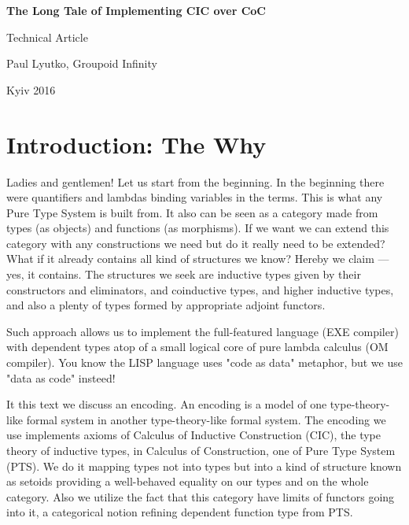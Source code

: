 \documentclass[11pt,oneside]{article}
\begin{document}
\thispagestyle{empty}
\begin{center}
\vspace{3cm}
    \vspace{3cm}   {\Large \bf The Long Tale of Implementing CIC over CoC\\}\par
    \vspace{0.3cm} {\Large Technical Article\par}
    \vspace{0.3cm} {\Large Paul Lyutko, Groupoid Infinity\par}
    \vspace{4cm}   {\Large Kyiv 2016}
\end{center}

\newpage
\vspace{2cm}
\tableofcontents

\newpage
\section{Introduction: The Why}

Ladies and gentlemen! Let us start from the beginning.
In the beginning there were quantifiers and lambdas binding variables in the terms.
This is what any Pure Type System is built from.
It also can be seen as a category made from types (as objects) and functions (as morphisms).
If we want we can extend this category with any constructions
we need but do it really need to be extended?
What if it already contains all kind of structures we know?
Hereby we claim --- yes, it contains.
The structures we seek are inductive types given by their constructors and eliminators,
and coinductive types, and higher inductive types, and also
a plenty of types formed by appropriate adjoint functors.

Such approach allows us to implement the full-featured language (EXE compiler)
with dependent types atop of a small logical core of pure lambda calculus (OM compiler).
You know the LISP language uses "code as data" metaphor, but we use "data as code" insteed!

It this text we discuss an encoding. An encoding is a model of one type-theory-like formal
system in another type-theory-like formal system. The encoding we use implements axioms
of Calculus of Inductive Construction (CIC), the type theory of inductive types,
in Calculus of Construction, one of Pure Type System (PTS).
We do it mapping types not into types but into a kind of structure known
as setoids providing a well-behaved equality on our types and on the whole category.
Also we utilize the fact that this category have limits of functors going into it,
a categorical notion refining dependent function type from PTS.
\end{document}

